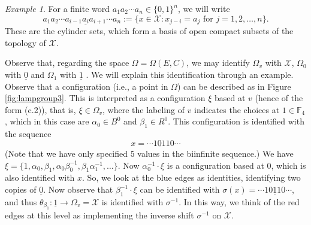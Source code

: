 \documentclass[11pt]{amsart}
\def\ul{\underline}
\theoremstyle{plain}            %
\theoremstyle{definition}       %
\theoremstyle{definition}       %
\theoremstyle{remark}
\newtheorem{example}[theorem]{Example}
\begin{document}
\begin{example}
For a finite word $a_1a_2\cdots a_n\in \{ 0,1 \}^n$, we will write
 $$ a_1a_2 \cdots a_{i-1}\underline{a_i} a_{i+1}\cdots a_n := \{ x\in \mathcal X : x_{j-i}= a_j \text{ for } j=1,2,\dots , n \}.$$
These are the cylinder sets, which form a basis of open compact subsets of the topology of $\mathcal X$. 

Observe that, regarding the space $\Omega = \Omega (E,C)$, we may identify $\Omega_v$ with $\mathcal X$, $\Omega_0$ with $\ul{0}$ and $\Omega_1$ with $\ul{1}$ .
We will explain this identification through an example. Observe that a configuration (i.e., a point in $\Omega$) can be described as in 
Figure \ref{fig:lampgroup3}. This is interpreted as a configuration $\xi$ based at $v$ (hence of the form (c.2)), that is, $\xi\in \Omega_v$, where the labeling of $v$ indicates the
choices at $1\in \mathbb F_4$, which in this case are $\alpha_0\in B^0$ and $\beta_1\in R^0$. This configuration is identified with the sequence
$$ x = \cdots 1 \underline{0} 1 1 0 \cdots $$
(Note that we have only specified $5$ values in the biinfinite sequence.)
We have $\xi = \{1,\alpha_0,\beta_1, \alpha_0\beta_0^{-1}, \beta_1\alpha_1^{-1},\dots  \}$. Now $\alpha_0^{-1} \cdot \xi$ is a configuration based at $0$, 
which is also identified with $x$. So, we look at the blue edges as identities, identifying two copies of $\ul{0}$. Now observe that
$\beta_1^{-1} \cdot \xi$ can be identified with $\sigma(x) =  \cdots 1 0\underline{1} 1 0 \cdots $, and thus $\theta_{\beta_1}\colon \ul{1} \to \Omega _v =\mathcal X$ is identified with $\sigma^{-1}$. 
In this way, we think of the red edges at this level as implementing the inverse shift $\sigma^{-1}$
on $\mathcal X$.



\end{example}
\end{document}
